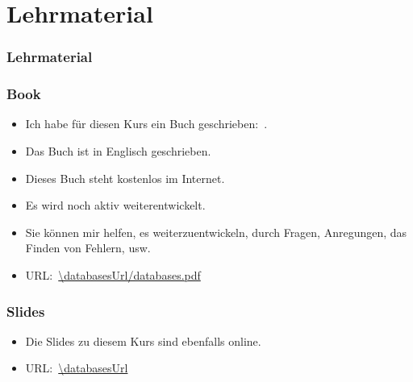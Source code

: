 \documentclass[aspectratio=169,mathserif,notheorems]{beamer}%
\begin{document}
\section{Lehrmaterial}%
%
\begin{frame}%
\frametitle{Lehrmaterial}%
%
\end{frame}%
%
\begin{frame}%
\frametitle{Book}%
\begin{itemize}%
\item Ich habe für diesen Kurs ein Buch geschrieben:~\cite{databases}.%
\item<2-> Das Buch ist in Englisch geschrieben.%
\item<3-> Dieses Buch steht kostenlos im Internet.%
\item<4-> Es wird noch aktiv weiterentwickelt.%
\item<5-> \alert{Sie} können mir helfen, es weiterzuentwickeln, durch Fragen, Anregungen, das Finden von Fehlern, usw.%
\item<6-> URL:~\expandafter\url{\databasesUrl/databases.pdf}%
\end{itemize}%
\end{frame}%
%
\begin{frame}%
\frametitle{Slides}%
\begin{itemize}%
\item Die Slides zu diesem Kurs sind ebenfalls online.%
\item<2-> URL:~\expandafter\url{\databasesUrl}%
\end{itemize}%
\end{frame}%
%
\end{document}
